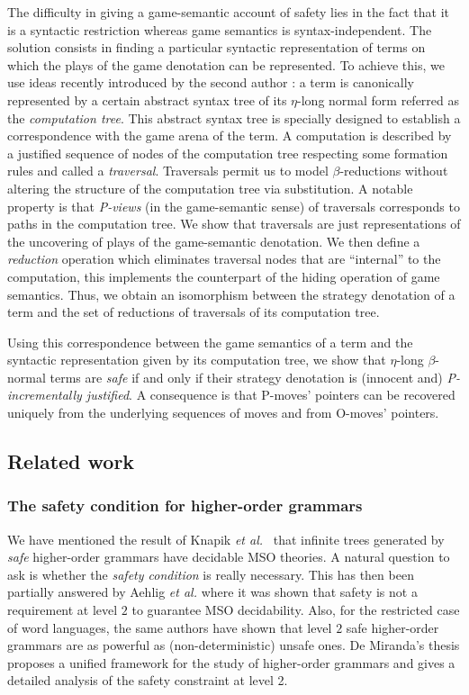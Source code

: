 \documentclass{llncs}
\begin{document}
The difficulty in giving a game-semantic account of safety lies in the
fact that it is a syntactic restriction whereas game semantics is
syntax-independent. The solution consists in finding a particular
syntactic representation of terms on which the plays of the game
denotation can be represented.  To achieve this, we use ideas recently
introduced by the second author \cite{OngLics2006}: a term is
canonically represented by a certain abstract syntax tree of its
$\eta$-long normal form referred as the \emph{computation tree}. This
abstract syntax tree is specially designed to establish a
correspondence with the game arena of the term. A computation is
described by a justified sequence of nodes of the computation tree
respecting some formation rules and called a
\emph{traversal}. Traversals permit us to model $\beta$-reductions
without altering the structure of the computation tree via
substitution. A notable property is that \emph{P-views} (in the
game-semantic sense) of traversals corresponds to paths in the
computation tree.  We show that traversals are just representations of
the uncovering of plays of the game-semantic denotation. We then
define a \emph{reduction} operation which eliminates traversal nodes
that are ``internal'' to the computation, this implements the
counterpart of the hiding operation of game semantics. Thus, we obtain
an isomorphism between the strategy denotation of a term and the set
of reductions of traversals of its computation tree.

Using this correspondence between the game semantics of a term and the
syntactic representation given by its computation tree, we show that
$\eta$-long $\beta$-normal terms are \emph{safe} if and only if their
strategy denotation is (innocent and) \emph{P-incrementally
  justified}. A consequence is that P-moves' pointers can be recovered
uniquely from the underlying sequences of moves and from O-moves'
pointers.

\subsection{Related work}

\subsubsection{The safety condition for higher-order grammars}

We have mentioned the result of Knapik \emph{et al.}~\cite{KNU02} that
infinite trees generated by \emph{safe} higher-order grammars have
decidable MSO theories.  A natural question to ask is whether the
\emph{safety condition} is really necessary.  This has then been
partially answered by Aehlig \emph{et al.}
\cite{DBLP:conf/tlca/AehligMO05} where it was shown that safety is not
a requirement at level $2$ to guarantee MSO decidability. Also, for
the restricted case of word languages, the same authors have shown
\cite{DBLP:conf/fossacs/AehligMO05} that level $2$ safe higher-order
grammars are as powerful as (non-deterministic) unsafe ones.  De
Miranda's thesis \cite{demirandathesis} proposes a unified framework
for the study of higher-order grammars and gives a detailed analysis
of the safety constraint at level 2.
\end{document}
